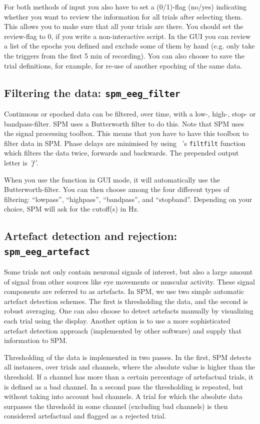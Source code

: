 For both methods of input you also have to set a (0/1)-flag (no/yes) indicating whether you want to review the information for all trials after selecting them. This allows you to make sure that all your trials are there. You should set the review-flag to 0, if you write a non-interactive script. In the GUI you can review a list of the epochs you defined and exclude some of them by hand (e.g. only take the triggers from the first 5 min of recording). You can also choose to save the trial definitions, for example, for re-use of another epoching of the same data.

\subsection{Filtering the data: \texttt{spm\_eeg\_filter}} 
Continuous or epoched data can be filtered, over time, with a low-, high-, stop- or bandpass-filter. SPM uses a Butterworth filter to do this. Note that SPM uses the signal processing toolbox. This means that you have to have this toolbox to filter data in SPM. Phase delays are minimised by using \matlab\ 's \texttt{filtfilt} function which filters the data twice, forwards and backwards. The prepended output letter is \textit{'f'}.

When you use the function in GUI mode, it will automatically
use the Butterworth-filter. You can then choose among the four different types of filtering: ``lowpass'', ``highpass'', ``bandpass'',
and ``stopband''. Depending on your choice, SPM will ask for the cutoff(s) in Hz.


\subsection{Artefact detection and rejection: \texttt{spm\_eeg\_artefact}}
Some trials not only contain neuronal signals of interest, but also a large amount of signal from other sources like eye movements or muscular activity. These signal components are referred to as artefacts. In SPM, we use two simple automatic artefact detection schemes. The first is thresholding the data, and the second is robust averaging. One can also choose to detect artefacts manually by visualizing each trial using the display. Another option is to use a more sophisticated artefact detection approach (implemented by other software) and supply that information to SPM.

Thresholding of the data is implemented in two passes. In the first, SPM detects all instances, over trials and channels, where the absolute value is higher than the threshold. If a channel has more than a certain percentage of artefactual trials, it is defined as a bad channel. In a second pass the thresholding is repeated, but without taking into account bad channels. A trial for which the absolute data surpasses the threshold in some channel (excluding bad channels) is then considered artefactual and flagged as a rejected trial.

